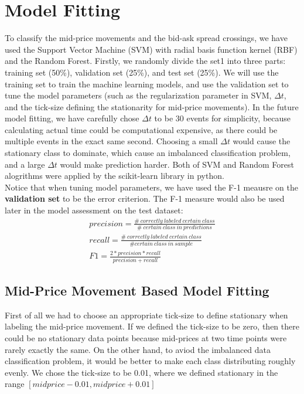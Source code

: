 \documentclass[11pt]{article}
\begin{document}
\section{Model Fitting}
To classify the mid-price movements and the bid-ask spread crossings, we have used the Support Vector Machine (SVM) with radial basis function kernel (RBF) and the Random Forest. Firstly, we randomly divide the set1 into three parts: training set (50\%), validation set (25\%), and test set (25\%). We will use the training set to train the machine learning models, and use the validation set to tune the model parameters (such as the regularization parameter in SVM, $\Delta t$, and the tick-size defining the stationarity for mid-price movements). In the future model fitting, we have carefully chose $\Delta t$ to be 30 events for simplicity, because calculating actual time could be computational expensive, as there could be multiple events in the exact same second. Choosing a small $\Delta t$ would cause the stationary class to dominate, which cause an imbalanced classification problem, and a large $\Delta t$ would make prediction harder.  Both of SVM and Random Forest alogrithms were applied by the scikit-learn library in python.\\
Notice that when tuning model parameters, we have used the F-1 meausre on the \textbf{validation set} to be the error criterion. The F-1 measure would also be used later in the model assessment on the test dataset:
\begin{align*}
precision=\frac{\#\ correctly\ labeled\ certain\ class}{\#\ certain\ class\ in\ predictions}\\
recall=\frac{\#\ correctly\ labeled\ certain\ class}{\# certain\ class\ in\ sample}\\
F1=\frac{2*precision*recall}{precision+recall}
\end{align*}
\subsection{Mid-Price Movement Based Model Fitting}
First of all we had to choose an appropriate tick-size to define stationary when labeling the mid-price movement. If we defined the tick-size to be zero, then there could be no stationary data points because mid-prices at two time points were rarely exactly the same. On the other hand, to aviod the imbalanced data classification problem, it would be better to make each class distributing roughly evenly. We chose the tick-size to be 0.01, where we defined stationary in the range $[midprice-0.01,midprice+0.01]$
\end{document}
